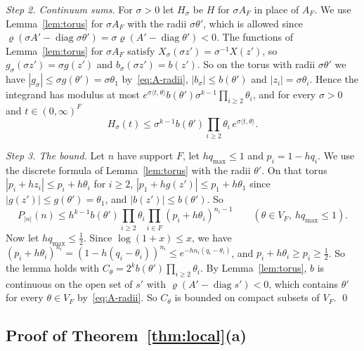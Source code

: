 \emph{Step 2. Continuum sums.} For $\sigma>0$ let $H_\sigma$ be $H$ for $\sigma A_F$
in place of $A_F$. We use Lemma~\ref{lem:torus} for
$\sigma A_F$ with the radii $\sigma\theta'$, which is allowed since
$\varrho(\sigma A'-\operatorname{diag}\sigma\theta')
=\sigma\varrho(A'-\operatorname{diag}\theta')<0$. The functions of
Lemma~\ref{lem:torus} for $\sigma A_F$ satisfy
$X_\sigma(\sigma z')=\sigma^{-1}X(z')$, so $g_\sigma(\sigma z')=\sigma g(z')$
and $b_\sigma(\sigma z')=b(z')$. So on the torus with radii $\sigma\theta'$
we have $|g_\sigma|\le\sigma g(\theta')=\sigma\theta_1$
by~\eqref{eq:A-radii}, $|b_\sigma|\le b(\theta')$ and
$|z_i|=\sigma\theta_i$. Hence the integrand has modulus at most
$e^{\sigma\langle t,\theta\rangle}b(\theta')\sigma^{k-1}
\prod_{i\ge2}\theta_i$, and for every $\sigma>0$ and $t\in(0,\infty)^F$
\begin{equation}\label{eq:A-Hsigma}
H_\sigma(t)\le\sigma^{k-1}b(\theta')\prod_{i\ge2}\theta_i\,
e^{\sigma\langle t,\theta\rangle}.
\end{equation}

\emph{Step 3. The bound.} Let $n$ have support $F$, let $hq_{\max}\le1$ and
$p_i=1-hq_i$. We use the discrete formula of Lemma~\ref{lem:torus} with the radii
$\theta'$. On that torus $|p_i+hz_i|\le p_i+h\theta_i$ for $i\ge2$,
$|p_1+hg(z')|\le p_1+h\theta_1$ since $|g(z')|\le g(\theta')=\theta_1$, and
$|b(z')|\le b(\theta')$. So
\begin{equation}\label{eq:A-chernoff}
P_{|n|}(n)\le h^{k-1}b(\theta')\prod_{i\ge2}\theta_i
\prod_{i\in F}(p_i+h\theta_i)^{n_i-1}
\qquad(\theta\in V_F,\ hq_{\max}\le1).
\end{equation}
Now let $hq_{\max}\le\frac12$. Since $\log(1+x)\le x$, we have
$(p_i+h\theta_i)^{n_i}=(1-h(q_i-\theta_i))^{n_i}\le e^{-hn_i(q_i-\theta_i)}$, and
$p_i+h\theta_i\ge p_i\ge\frac12$. So the lemma holds with
$C_\theta=2^kb(\theta')\prod_{i\ge2}\theta_i$. By Lemma~\ref{lem:torus}, $b$ is
continuous on the open set of $s'$ with $\varrho(A'-\operatorname{diag}s')<0$, which
contains $\theta'$ for every $\theta\in V_F$ by~\eqref{eq:A-radii}. So $C_\theta$ is
bounded on compact subsets of $V_F$. \qed

\subsection{Proof of \texorpdfstring{Theorem~\ref{thm:local}(a)}{the local law}}

